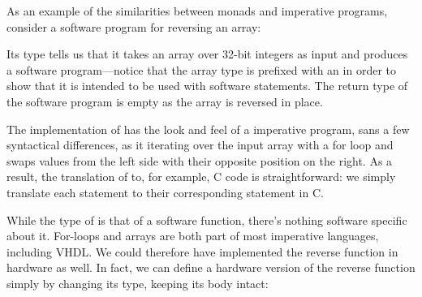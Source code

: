 \documentclass[../main.tex]{subfiles}
\begin{document}
As an example of the similarities between monads and imperative programs, consider a software program for reversing an array:


\noindent Its type tells us that it takes an array over 32-bit integers as input and produces a software program---notice that the array type  is prefixed with an  in order to show that it is intended to be used with software statements. The return type of the software program is empty as the array is reversed in place.

The implementation of  has the look and feel of a imperative program, sans a few syntactical differences, as it iterating over the input array with a for loop and swaps values from the left side with their opposite position on the right. As a result, the translation of  to, for example, C code is straightforward: we simply translate each statement to their corresponding statement in C. %




While the type of  is that of a software function, there's nothing software specific about it. For-loops and arrays are both part of most imperative languages, including VHDL. We could therefore have implemented the reverse function in hardware as well. In fact, we can define a hardware version of the reverse function simply by changing its type, keeping its body intact:
\end{document}
